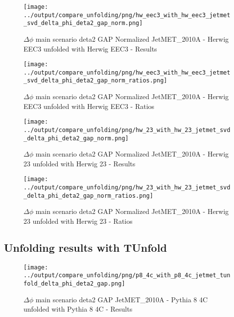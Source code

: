 \documentclass[11pt]{book}
\begin{document}
\begin{figure}[ht]
\centering
\texttt{[image: ../output/compare\_unfolding/png/hw\_eec3\_with\_hw\_eec3\_jetmet\_svd\_delta\_phi\_deta2\_gap\_norm.png]}
\caption{$\Delta\phi$ main scenario deta2 GAP Normalized JetMET\_2010A - Herwig EEC3 unfolded with Herwig EEC3 - Results}
\label{hw_eec3_hw_eec3_jetmet_svd_delta_phi_deta2_gap_norm_a}
\end{figure}

\begin{figure}[ht]
\centering
\texttt{[image: ../output/compare\_unfolding/png/hw\_eec3\_with\_hw\_eec3\_jetmet\_svd\_delta\_phi\_deta2\_gap\_norm\_ratios.png]}
\caption{$\Delta\phi$ main scenario deta2 GAP Normalized JetMET\_2010A - Herwig EEC3 unfolded with Herwig EEC3 - Ratios}
\label{hw_eec3_hw_eec3_jetmet_svd_delta_phi_deta2_gap_norm_b}
\end{figure}

\begin{figure}[ht]
\centering
\texttt{[image: ../output/compare\_unfolding/png/hw\_23\_with\_hw\_23\_jetmet\_svd\_delta\_phi\_deta2\_gap\_norm.png]}
\caption{$\Delta\phi$ main scenario deta2 GAP Normalized JetMET\_2010A - Herwig 23 unfolded with Herwig 23 - Results}
\label{hw_23_hw_23_jetmet_svd_delta_phi_deta2_gap_norm_a}
\end{figure}

\begin{figure}[ht]
\centering
\texttt{[image: ../output/compare\_unfolding/png/hw\_23\_with\_hw\_23\_jetmet\_svd\_delta\_phi\_deta2\_gap\_norm\_ratios.png]}
\caption{$\Delta\phi$ main scenario deta2 GAP Normalized JetMET\_2010A - Herwig 23 unfolded with Herwig 23 - Ratios}
\label{hw_23_hw_23_jetmet_svd_delta_phi_deta2_gap_norm_b}
\end{figure}


\clearpage
\subsection{Unfolding results with TUnfold}

\begin{figure}[ht]
\centering
\texttt{[image: ../output/compare\_unfolding/png/p8\_4c\_with\_p8\_4c\_jetmet\_tunfold\_delta\_phi\_deta2\_gap.png]}
\caption{$\Delta\phi$ main scenario deta2 GAP JetMET\_2010A - Pythia 8 4C unfolded with Pythia 8 4C - Results}
\label{p8_p8_jetmet_tunfold_delta_phi_deta2_gap_a}
\end{figure}
\end{document}

